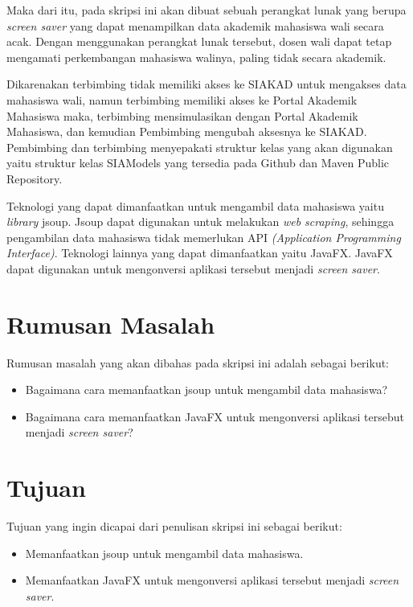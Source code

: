 \documentclass[a4paper,twoside]{article}
\begin{document}
Maka dari itu, pada skripsi ini akan dibuat sebuah perangkat lunak yang berupa \textit{screen saver} yang dapat menampilkan data akademik mahasiswa wali secara acak. Dengan menggunakan perangkat lunak tersebut, dosen wali dapat tetap mengamati perkembangan mahasiswa walinya, paling tidak secara akademik.

Dikarenakan terbimbing tidak memiliki akses ke SIAKAD untuk mengakses data mahasiswa wali, namun terbimbing memiliki akses ke Portal Akademik Mahasiswa maka, terbimbing mensimulasikan dengan Portal Akademik Mahasiswa, dan kemudian Pembimbing mengubah aksesnya ke SIAKAD. Pembimbing dan terbimbing menyepakati struktur kelas yang akan digunakan yaitu struktur kelas SIAModels yang tersedia pada Github dan Maven Public Repository.

Teknologi yang dapat dimanfaatkan untuk mengambil data mahasiswa yaitu \textit{library} jsoup. Jsoup dapat digunakan untuk melakukan \textit{web scraping}, sehingga pengambilan data mahasiswa tidak memerlukan API \textit{(Application Programming Interface)}. Teknologi lainnya yang dapat dimanfaatkan yaitu JavaFX. JavaFX dapat digunakan untuk mengonversi aplikasi tersebut menjadi \textit{screen saver}.

\section{Rumusan Masalah}
Rumusan masalah yang akan dibahas pada skripsi ini adalah sebagai berikut:
\begin{itemize}
	\item Bagaimana cara memanfaatkan jsoup untuk mengambil data mahasiswa?
	\item Bagaimana cara memanfaatkan JavaFX untuk mengonversi aplikasi tersebut menjadi \textit{screen saver}?
\end{itemize}   

\section{Tujuan}
Tujuan yang ingin dicapai dari penulisan skripsi ini sebagai berikut:
\begin{itemize}
    \item Memanfaatkan jsoup untuk mengambil data mahasiswa.
    \item Memanfaatkan JavaFX untuk mengonversi aplikasi tersebut menjadi \textit{screen saver}.
\end{itemize}
\end{document}
